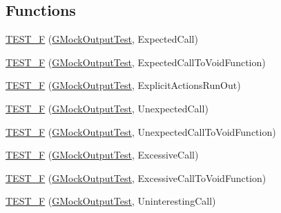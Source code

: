 \subsection*{Functions}
\begin{DoxyCompactItemize}
\item 
\mbox{\hyperlink{_obj__test_2lib_2googletest-release-1_88_81_2googlemock_2test_2gmock__output__test___8cc_a5cae7729bb06b3064b765a06e58c2566}{T\+E\+S\+T\+\_\+F}} (\mbox{\hyperlink{class_g_mock_output_test}{G\+Mock\+Output\+Test}}, Expected\+Call)
\item 
\mbox{\hyperlink{_obj__test_2lib_2googletest-release-1_88_81_2googlemock_2test_2gmock__output__test___8cc_acafecaf97c5e08925e452e670cc9c60c}{T\+E\+S\+T\+\_\+F}} (\mbox{\hyperlink{class_g_mock_output_test}{G\+Mock\+Output\+Test}}, Expected\+Call\+To\+Void\+Function)
\item 
\mbox{\hyperlink{_obj__test_2lib_2googletest-release-1_88_81_2googlemock_2test_2gmock__output__test___8cc_a9ea40a88b30f8b5507efbf486ac06761}{T\+E\+S\+T\+\_\+F}} (\mbox{\hyperlink{class_g_mock_output_test}{G\+Mock\+Output\+Test}}, Explicit\+Actions\+Run\+Out)
\item 
\mbox{\hyperlink{_obj__test_2lib_2googletest-release-1_88_81_2googlemock_2test_2gmock__output__test___8cc_a87e290b73a27f69e2352986b95a09fcb}{T\+E\+S\+T\+\_\+F}} (\mbox{\hyperlink{class_g_mock_output_test}{G\+Mock\+Output\+Test}}, Unexpected\+Call)
\item 
\mbox{\hyperlink{_obj__test_2lib_2googletest-release-1_88_81_2googlemock_2test_2gmock__output__test___8cc_aba5c783b0346beacc83af5ced4aeb7db}{T\+E\+S\+T\+\_\+F}} (\mbox{\hyperlink{class_g_mock_output_test}{G\+Mock\+Output\+Test}}, Unexpected\+Call\+To\+Void\+Function)
\item 
\mbox{\hyperlink{_obj__test_2lib_2googletest-release-1_88_81_2googlemock_2test_2gmock__output__test___8cc_afa4ca5a73e2af24d016e48ee70e10901}{T\+E\+S\+T\+\_\+F}} (\mbox{\hyperlink{class_g_mock_output_test}{G\+Mock\+Output\+Test}}, Excessive\+Call)
\item 
\mbox{\hyperlink{_obj__test_2lib_2googletest-release-1_88_81_2googlemock_2test_2gmock__output__test___8cc_ad8406b814788092ad25da61038706134}{T\+E\+S\+T\+\_\+F}} (\mbox{\hyperlink{class_g_mock_output_test}{G\+Mock\+Output\+Test}}, Excessive\+Call\+To\+Void\+Function)
\item 
\mbox{\hyperlink{_obj__test_2lib_2googletest-release-1_88_81_2googlemock_2test_2gmock__output__test___8cc_aa9159573c3f5f5bc7be3475e7398afc5}{T\+E\+S\+T\+\_\+F}} (\mbox{\hyperlink{class_g_mock_output_test}{G\+Mock\+Output\+Test}}, Uninteresting\+Call)

\end{DoxyCompactItemize}
